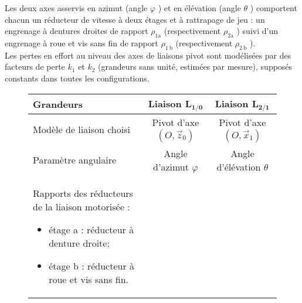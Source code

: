 Les deux axes asservis en azimut (angle $\varphi$ ) et en élévation (angle $\theta$ ) comportent chacun un réducteur de vitesse à deux étages et à rattrapage de jeu : un engrenage à dentures droites de rapport $\rho_{1 \mathrm{a}}$ (respectivement $\rho_{2 \mathrm{a}}$ ) suivi d'un engrenage à roue et vis sans fin de rapport $\rho_{1 \mathrm{~b}}$ (respectivement $\rho_{2 \mathrm{~b}}$ ).\\
Les pertes en effort au niveau des axes de liaisons pivot sont modélisées par des facteurs de perte $k_{1}$ et $k_{2}$ (grandeurs sans unité, estimées par mesure), supposés constants dans toutes les configurations.

\begin{figure}[!h]
\centering
\begin{tabular}{|p{6cm}|c|c|}
\hline
Grandeurs & Liaison $\boldsymbol{L}_{\mathbf{1 / 0}}$ & Liaison $\boldsymbol{L}_{\mathbf{2} / \mathbf{1}}$ \\
\hline
Modèle de liaison choisi & Pivot d'axe $\left(O, \vec{z}_{0}\right)$ & Pivot d'axe $\left(O, \vec{x}_{1}\right)$ \\
\hline
Paramètre angulaire & Angle d'azimut $\varphi$ & Angle d'élévation $\theta$ \\
\hline

Rapports des réducteurs de la liaison motorisée : 
\begin{itemize}
\item étage a : réducteur à denture droite;
\item étage b : réducteur à roue et vis sans fin.
\end{itemize}


\end{tabular}
\end{figure}
